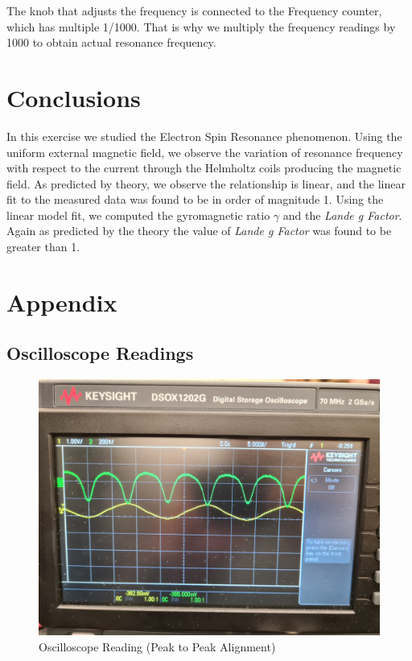 \documentclass[letterpaper,12pt]{article}
\begin{document}
The knob that adjusts the frequency is connected to the Frequency counter, which has multiple 1/1000. That is why 
we multiply the frequency readings by 1000 to obtain actual resonance frequency.

\section{Conclusions}
In this exercise we studied the Electron Spin Resonance phenomenon. Using the uniform external magnetic 
field, we observe the variation of resonance frequency with respect to the current through the Helmholtz coils
producing the magnetic field. As predicted by theory, we observe the relationship is linear, and the linear
fit to the measured data was found to be in order of magnitude 1. Using the linear model fit, we 
computed the gyromagnetic ratio $\gamma$ and the \emph{Lande g Factor}. Again as predicted by the theory 
the value of \emph{Lande g Factor} was found to be greater than 1.


\pagebreak

\appendix

\section{Appendix}

\subsection{Oscilloscope Readings}

\begin{figure}[H]
  \centering
  \includegraphics[width=1.0\linewidth]{../Fredrik/osc-p-p.jpg}    
  \begin{center}
    \begin{center}   
    \end{center}  \end{center}
  \caption{Oscilloscope Reading (Peak to Peak Alignment)}
  \label{osc}
\end{figure}
\end{document}
